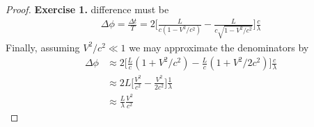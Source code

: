 \documentclass[11pt]{article}
\theoremstyle{definition}
\begin{document}
\begin{proof}{\textbf{Exercise 1.}}
difference must be
\begin{align*}
    \Delta\phi = \frac{\Delta t}{T}
    = 2\bigg[\frac{L}{c(1 - V^2/c^2)} - \frac{L}{c\sqrt{1 - V^2/c^2}}\bigg]
    \frac{c}{\lambda}
\end{align*}
Finally, assuming $V^2/c^2 \ll 1$ we may approximate the denominators by
\begin{align*}
    \Delta\phi
    &\approx 2\bigg[
    \frac{L}{c}(1 + V^2/c^2)- \frac{L}{c}(1 + V^2/2c^2)
    \bigg]
    \frac{c}{\lambda}\\
    &\approx 2L\bigg[
    \frac{V^2}{c^2}- \frac{V^2}{2c^2}
    \bigg]
    \frac{1}{\lambda}\\
    &\approx 
    \frac{L}{\lambda}
    \frac{V^2}{c^2}
\end{align*}
\end{proof}
\end{document}

